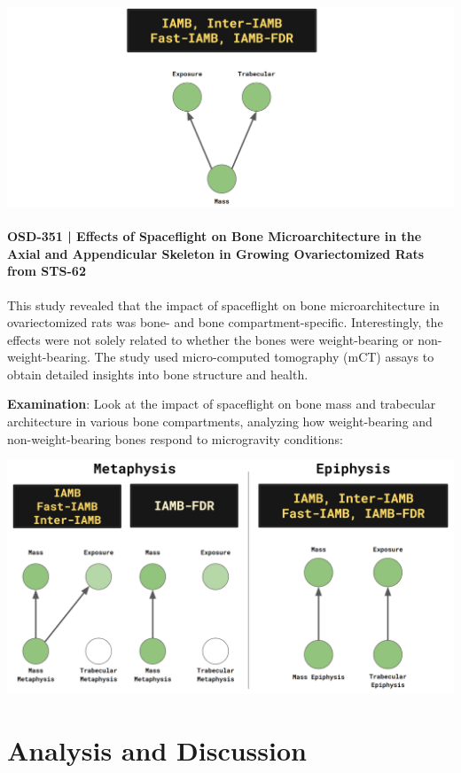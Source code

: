 \documentclass{article}
\begin{document}
\includegraphics[width=\textwidth,height=\textheight,keepaspectratio]{OSD-489.png}


\paragraph{OSD-351 | Effects of Spaceflight on Bone Microarchitecture in the Axial and Appendicular Skeleton in Growing Ovariectomized Rats from STS-62}
This study revealed that the impact of spaceflight on bone microarchitecture in ovariectomized rats was bone- and bone compartment-specific. Interestingly, the effects were not solely related to whether the bones were weight-bearing or non-weight-bearing. The study used micro-computed tomography (mCT) assays to obtain detailed insights into bone structure and health.

\quad\quad\textbf{Examination}:  Look at the impact of spaceflight on bone mass and trabecular architecture in various bone compartments, analyzing how weight-bearing and non-weight-bearing bones respond to microgravity conditions:

\includegraphics[width=\textwidth,height=\textheight,keepaspectratio]{OSD-351.png}




\section{Analysis and Discussion}
\end{document}
